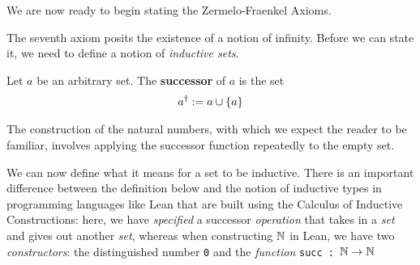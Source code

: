 
We are now ready to begin stating the Zermelo-Fraenkel Axioms.

\begin{baxiom}
    \sorry
\end{baxiom}

\begin{baxiom}
    \sorry
\end{baxiom}

\begin{baxiom}
    \sorry
\end{baxiom}

\begin{baxiom}
    \sorry
\end{baxiom}

\begin{baxiom}
    \sorry
\end{baxiom}

\begin{baxiom}
    \sorry
\end{baxiom}

\sorry


The seventh axiom posits the existence of a notion of infinity. Before we can state it, we need to define a notion of \textit{inductive sets}.

\begin{boxdefinition}
    Let $a$ be an arbitrary set. The \textbf{successor} of $a$ is the set
    \begin{align*}
        a^{\dagger} := a \cup \left\{ a \right\}
    \end{align*}
\end{boxdefinition}

The construction of the natural numbers, with which we expect the reader to be familiar, involves applying the successor function repeatedly to the empty set.

We can now define what it means for a set to be inductive. There is an important difference between the definition below and the notion of inductive types in programming languages like Lean that are built using the Calculus of Inductive Constructions: here, we have \textit{specified} a successor \textit{operation} that takes in a \textit{set} and gives out another \textit{set}, whereas when constructing $\mathbb{N}$ in Lean, we have two \textit{constructors}: the distinguished number \texttt{0} and the \textit{function} \texttt{succ~:~$\mathbb{N} \to \mathbb{N}$}

